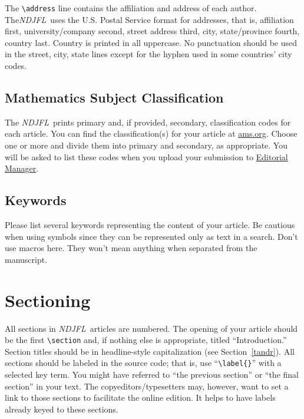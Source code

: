 \documentclass{ndjflart}
\theoremstyle{definition}
\theoremstyle{remark}
\newcommand{\NDJFL}{\emph{NDJFL}}
\begin{document}
The \verb=\address= line contains the affiliation and address of each
author.  The\linebreak \NDJFL\ uses the U.S. Postal Service format for
addresses, that is, affiliation first, university/company second,
street address third, city, state/province fourth, country last.
Country is printed in all uppercase. No punctuation should be used in
the street, city, state lines except for the hyphen used in some
countries' city codes.

\subsection{Mathematics Subject Classification}\label{msc} 
The \NDJFL\ prints primary and, if provided, secondary, classification
codes for each article.  You can find the classification(s) for your
article at
\href{http://www.ams.org/mathscinet/freeTools.html}{ams.org}.  Choose
one or more and divide them into primary and secondary, as
appropriate.  You will be asked to list these codes when you upload
your submission to
\href{http://www.editorialmanager.com/ndjfl}{Editorial Manager}.

\subsection{Keywords}\label{kwd} Please list several keywords
representing the content of your article.  Be cautious when using
symbols since they can be represented only as text in a search.  Don't
use macros here. They won't mean anything when separated from the
manuscript.


\section{Sectioning}\label{secs} All sections in \NDJFL\ articles are
numbered.  The opening of your article should be the first
\verb=\section= and, if nothing else is appropriate, titled
``Introduction.''  Section titles should be in headline-style capitalization (see Section~\ref{tandr}).  All sections should be labeled in the source code;
that is, use ``\verb=\label{}='' with a selected key term.  You might
have referred to ``the previous section'' or ``the final section'' in
your text.  The copyeditors/typesetters may, however, want to set a
link to those sections to facilitate the online edition.  It helps to
have labels already keyed to these sections.
\end{document}
